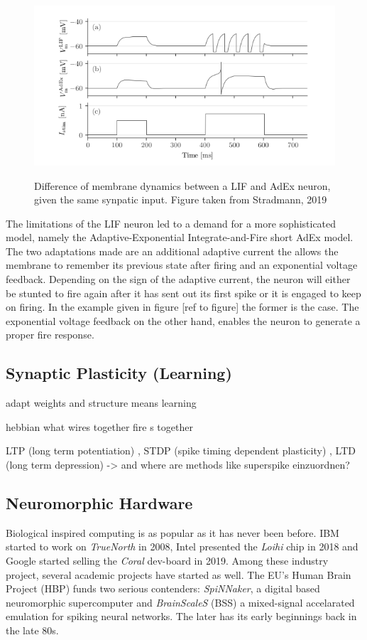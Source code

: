 \begin{figure}
	\includegraphics[width=\linewidth]{figures/LIFvsAdEx.png}
	\label{lifvsadex}
	\caption{Difference of membrane dynamics between a LIF and AdEx neuron, given the same synpatic input. Figure taken from Stradmann, 2019}
\end{figure}

The limitations of the LIF neuron led to a demand for a more sophisticated model, namely the Adaptive-Exponential Integrate-and-Fire short AdEx model. The two adaptations made are an additional adaptive current the allows the membrane to remember its previous state after firing and an exponential voltage feedback. Depending on the sign of the adaptive current, the neuron will either be stunted to fire again after it has sent out its first spike or it is engaged to keep on firing. In the example given in figure [ref to figure] the former is the case. The exponential voltage feedback on the other hand, enables the neuron to generate a proper fire response.\\

\subsection{Synaptic Plasticity (Learning)}
adapt weights and structure means learning

hebbian what wires together fire s together

LTP (long term potentiation) , STDP (spike timing dependent plasticity) , LTD (long term depression) -> and where are methods like superspike einzuordnen?


\subsection{Neuromorphic Hardware}
Biological inspired computing is as popular as it has never been before. IBM started to work on \textit{TrueNorth} in 2008, Intel presented the \textit{Loihi} chip in 2018 and Google started selling the \textit{Coral} dev-board in 2019. Among these industry project, several academic projects have started as well. The EU's Human Brain Project (HBP) funds two serious contenders: \textit{SpiNNaker}, a digital based neuromorphic supercomputer and \textit{BrainScaleS} (BSS) a mixed-signal accelarated emulation for spiking neural networks. The later has its early beginnings back in the late 80s.

